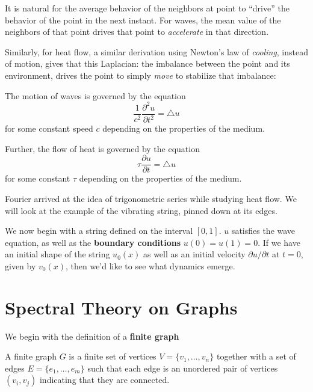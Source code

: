 	It is natural for the average behavior of the neighbors at point to ``drive'' the behavior of the point in the next instant. For waves, the mean value of the neighbors of that point drives that point to \emph{accelerate} in that direction. 
	
	Similarly, for heat flow, a similar derivation using Newton's law of \emph{cooling}, instead of motion, gives that this Laplacian: the imbalance between the point and its environment, drives the point to simply \emph{move} to stabilize that imbalance:
	\begin{concept}
		The motion of waves is governed by the equation
		\begin{equation*}
			\frac{1}{c^2} \frac{\partial^2 u}{\partial t^2} = \triangle u
		\end{equation*}
		for some constant speed $c$ depending on the properties of the medium.
		
		Further, the flow of heat is governed by the equation
		\begin{equation*}
			\tau \frac{\partial u}{\partial t} = \triangle u
		\end{equation*}
		for some constant $\tau$ depending on the properties of the medium. 
	\end{concept}
	
	Fourier arrived at the idea of trigonometric series while studying heat flow. We will look at the example of the vibrating string, pinned down at its edges. 
	
	We now begin with a string defined on the interval $[0,1]$. $u$ satisfies the wave equation, as well as the \textbf{boundary conditions} $u(0)= u(1)= 0$. If we have an initial shape of the string $u_0(x)$ as well as an initial velocity $\partial u/\partial t$ at $t=0$, given by $v_0(x)$, then we'd like to see what dynamics emerge. 
	
	


\section{Spectral Theory on Graphs} %
\label{sec:spectral_theory_on_graphs}

	We begin with the definition of a \textbf{finite graph}
	\begin{defn}
		A finite graph $G$ is a finite set of vertices $V = \{v_1, \dots, v_n\}$ together with a set of edges $E = \{e_1, \dots, e_m\}$ such that each edge is an unordered pair of vertices $(v_i, v_j)$ indicating that they are connected.
	\end{defn}
	
